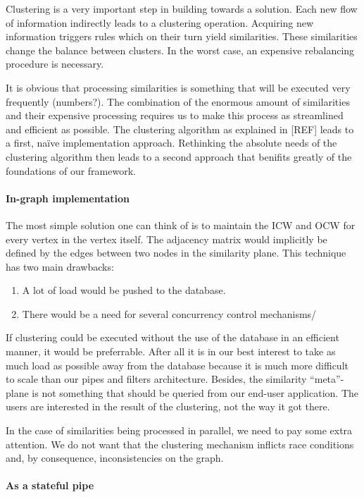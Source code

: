 Clustering is a very important step in building towards a solution. Each new flow of information indirectly leads to a clustering operation. Acquiring new information triggers rules which on their turn yield similarities. These similarities change the balance between clusters. In the worst case, an expensive rebalancing procedure is necessary.

It is obvious that processing similarities is something that will be executed very frequently (numbers?). The combination of the enormous amount of similarities and their expensive processing requires us to make this process as streamlined and efficient as possible. The clustering algorithm as explained in [REF] leads to a first, na\"ive implementation approach. Rethinking the absolute needs of the clustering algorithm then leads to a second approach that benifits greatly of the foundations of our framework.

\paragraph{In-graph implementation} The most simple solution one can think of is to maintain the ICW and OCW for every vertex in the vertex itself. The adjacency matrix would implicitly be defined by the edges between two nodes in the similarity plane. This technique has two main drawbacks:

\begin{enumerate}
\item A lot of load would be pushed to the database.
\item There would be a need for several concurrency control mechanisms/
\end{enumerate}

If clustering could be executed without the use of the database in an efficient manner, it would be preferrable. After all it is in our best interest to take as much load as possible away from the database because it is much more difficult to scale than our pipes and filters architecture. Besides, the similarity ``meta''-plane is not something that should be queried from our end-user application. The users are interested in the result of the clustering, not the way it got there.

In the case of similarities being processed in parallel, we need to pay some extra attention. We do not want that the clustering mechanism inflicts race conditions and, by consequence, inconsistencies on the graph.


\paragraph{As a stateful pipe}

